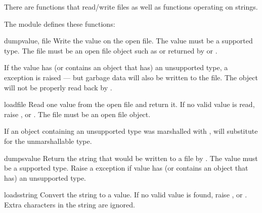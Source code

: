 There are functions that read/write files as well as functions
operating on strings.

The module defines these functions:

\begin{funcdesc}{dump}{value, file}
  Write the value on the open file.  The value must be a supported
  type.  The file must be an open file object such as
   or returned by  or
  .

  If the value has (or contains an object that has) an unsupported type,
  a  exception is raised --- but garbage data
  will also be written to the file.  The object will not be properly
  read back by .
\end{funcdesc}

\begin{funcdesc}{load}{file}
  Read one value from the open file and return it.  If no valid value
  is read, raise ,  or
  .  The file must be an open file object.

   If an object containing an unsupported type was
  marshalled with ,  will substitute
   for the unmarshallable type.
\end{funcdesc}

\begin{funcdesc}{dumps}{value}
  Return the string that would be written to a file by
  .  The value must be a supported
  type.  Raise a  exception if value has (or
  contains an object that has) an unsupported type.
\end{funcdesc}

\begin{funcdesc}{loads}{string}
  Convert the string to a value.  If no valid value is found, raise
  ,  or
  .  Extra characters in the string are ignored.
\end{funcdesc}
